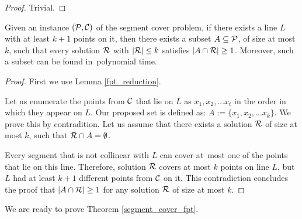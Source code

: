 \begin{proof} Trivial. \end{proof}

\begin{lemma}
	\label{fpt_long_lines}
	Given an instance $(\mathcal{P}, \mathcal{C})$ of the segment cover problem,
	if there exists a line $L$ with at least
	$k+1$ points on it, then there exists a subset $A \subseteq \mathcal{P}$,
	of size at most $k$,
	such that every solution $\mathcal{R}$ with $|\mathcal{R}| \le k$
	satisfies $|A \cap \mathcal{R}| \ge 1$.
	Moreover, such a subset can be found in~polynomial time.
\end{lemma}

\begin{proof}

First we use Lemma \ref{fpt_reduction}.

Let us enumerate the points from $\mathcal{C}$ that lie on $L$ as $x_1, x_2, \ldots x_t$
in the order in which they appear on $L$.
Our proposed set is defined as: $A := \{ x_1, x_2, \ldots x_k\}$.
We prove this by contradition. Let us assume that there
exists a solution $\mathcal{R}$ of size at most $k$, such that $\mathcal{R} \cap A = \emptyset$.

Every segment that is not collinear with $L$ can cover at~most one of
the points that lie on this line.
Therefore, solution $\mathcal{R}$ covers at most $k$ points on line $L$,
but $L$ had at least $k+1$ different points from $\mathcal{C}$ on it.
This contradiction concludes the proof that $|A \cap \mathcal{R}| \ge 1$
for any solution $\mathcal{R}$ of size at most $k$.
\end{proof}

We are ready to prove Theorem \ref{segment_cover_fpt}.

